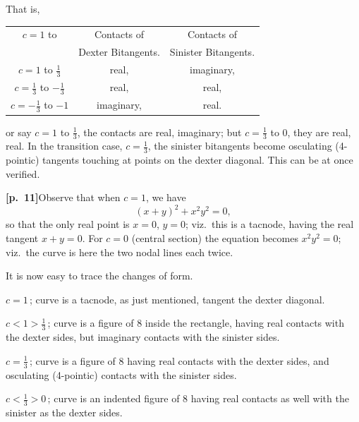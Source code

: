 \documentclass[11pt,a4paper]{article}
\begin{document}
\medskip

That is,

\begin{center}
\renewcommand{\arraystretch}{1.2}
\begin{tabular}{|c|c|c|}
\hline
$c = 1$ to & Contacts of & Contacts of \\
& Dexter Bitangents. & Sinister Bitangents. \\
\hline
$c = 1$ to $\tfrac{1}{3}$ & real, & imaginary, \\
\hline
$c = \tfrac{1}{3}$ to $-\tfrac{1}{3}$ & real, & real, \\
\hline
$c = -\tfrac{1}{3}$ to $-1$ & imaginary, & real. \\
\hline
\end{tabular}
\end{center}

\medskip

\noindent or say $c = 1$ to $\tfrac{1}{3}$, the contacts are real, imaginary; but $c = \tfrac{1}{3}$ to $0$, they are real, real. In the transition case, $c = \tfrac{1}{3}$, the sinister bitangents become osculating (4-pointic) tangents touching at points on the dexter diagonal. This can be at once verified.

\bigskip

\noindent\textbf{[p.~11]}\quad Observe that when $c = 1$, we have
\[
(x + y)^{2} + x^{2}y^{2} = 0,
\]
so that the only real point is $x = 0$, $y = 0$; viz.\ this is a tacnode, having the real tangent $x + y = 0$. For $c = 0$ (central section) the equation becomes $x^{2}y^{2} = 0$; viz.\ the curve is here the two nodal lines each twice.

\medskip

It is now easy to trace the changes of form.

\smallskip

$c = 1$\,; curve is a tacnode, as just mentioned, tangent the dexter diagonal.

\smallskip

$c < 1 > \tfrac{1}{3}$\,; curve is a figure of $8$ inside the rectangle, having real contacts with the dexter sides, but imaginary contacts with the sinister sides.

\smallskip

$c = \tfrac{1}{3}$\,; curve is a figure of $8$ having real contacts with the dexter sides, and osculating (4-pointic) contacts with the sinister sides.

\smallskip

$c < \tfrac{1}{3} > 0$\,; curve is an indented figure of $8$ having real contacts as well with the sinister as the dexter sides.
\end{document}
